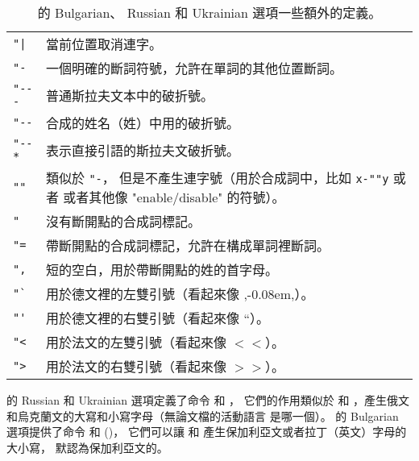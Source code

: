\begin{table}[htb]
  \begin{center}
  \caption[保加利亞文、俄文和烏克蘭文。]{ 的 Bulgarian、 Russian 和 Ukrainian 選項一些額外的定義。}\label{Cyrillic}
  \begin{tabular}{@{}p{.1\hsize}@{}p{.9\hsize}@{}}
   \hline
   \verb="|= & 當前位置取消連字。               \\
   \verb|"-| & 一個明確的斷詞符號，允許在單詞的其他位置斷詞。        \\
   \verb|"---| & 普通斯拉夫文本中的破折號。                     \\
   \verb|"-- | & 合成的姓名（姓）中用的破折號。    \\
   \verb|"--*| & 表示直接引語的斯拉夫文破折號。        \\
   \verb|""| & 類似於 \verb|"-|， 但是不產生連字號（用於合成詞中，比如 \verb|x-""y| 或者
                或者其他像 "enable/disable" 的符號）。 \\
   \verb|" | & 沒有斷開點的合成詞標記。       \\
   \verb|"=| & 帶斷開點的合成詞標記，允許在構成單詞裡斷詞。     \\
   \verb|",| & 短的空白，用於帶斷開點的姓的首字母。             \\
   \verb|"`| & 用於德文裡的左雙引號（看起來像 ,\kern-0.08em,）。 \\
   \verb|"'| & 用於德文裡的右雙引號（看起來像 ``）。       \\%
   \verb|"<| & 用於法文的左雙引號（看起來像 $<\!\!<$）。 \\
   \verb|">| & 用於法文的右雙引號（看起來像 $>\!\!>$）。 \\
   \hline
  \end{tabular}
  \end{center}
\end{table}


 的 Russian 和 Ukrainian 選項定義了命令  和 ，
它們的作用類似於  和 ，產生俄文和烏克蘭文的大寫和小寫字母（無論文檔的活動語言
是哪一個）。 的 Bulgarian 選項提供了命令  和  ()，
它們可以讓  和  產生保加利亞文或者拉丁（英文）字母的大小寫，
默認為保加利亞文的。

